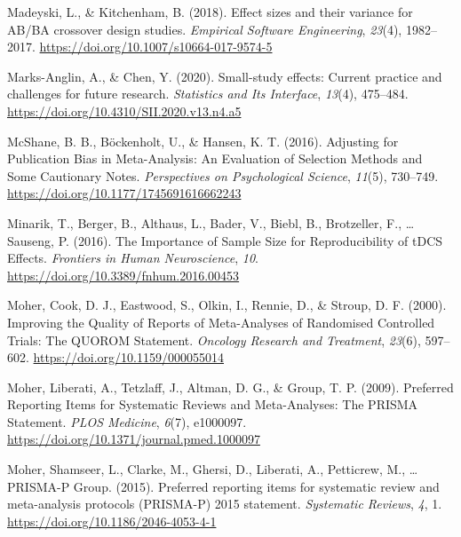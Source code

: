 \documentclass[
  man,floatsintext]{apa6}
\newlength{\cslhangindent}
\newlength{\cslentryspacingunit} %
\newenvironment{CSLReferences}[2] %
 {%
  \setlength{\parindent}{0pt}
  \ifodd #1
  \let\oldpar\par
  \def\par{\hangindent=\cslhangindent\oldpar}
  \fi
  \setlength{\parskip}{#2\cslentryspacingunit}
 }%
 {}
\begin{document}
\begin{CSLReferences}{1}{0}
\leavevmode{}%
Madeyski, L., \& Kitchenham, B. (2018). Effect sizes and their variance for {AB}/{BA} crossover design studies. \emph{Empirical Software Engineering}, \emph{23}(4), 1982--2017. \url{https://doi.org/10.1007/s10664-017-9574-5}

\leavevmode{}%
Marks-Anglin, A., \& Chen, Y. (2020). Small-study effects: Current practice and challenges for future research. \emph{Statistics and Its Interface}, \emph{13}(4), 475--484. \url{https://doi.org/10.4310/SII.2020.v13.n4.a5}

\leavevmode{}%
McShane, B. B., Böckenholt, U., \& Hansen, K. T. (2016). Adjusting for {Publication Bias} in {Meta-Analysis}: {An Evaluation} of {Selection Methods} and {Some Cautionary Notes}. \emph{Perspectives on Psychological Science}, \emph{11}(5), 730--749. \url{https://doi.org/10.1177/1745691616662243}

\leavevmode{}%
Minarik, T., Berger, B., Althaus, L., Bader, V., Biebl, B., Brotzeller, F., \ldots{} Sauseng, P. (2016). The {Importance} of {Sample Size} for {Reproducibility} of {tDCS Effects}. \emph{Frontiers in Human Neuroscience}, \emph{10}. \url{https://doi.org/10.3389/fnhum.2016.00453}

\leavevmode{}%
Moher, Cook, D. J., Eastwood, S., Olkin, I., Rennie, D., \& Stroup, D. F. (2000). Improving the {Quality} of {Reports} of {Meta-Analyses} of {Randomised Controlled Trials}: {The QUOROM Statement}. \emph{Oncology Research and Treatment}, \emph{23}(6), 597--602. \url{https://doi.org/10.1159/000055014}

\leavevmode{}%
Moher, Liberati, A., Tetzlaff, J., Altman, D. G., \& Group, T. P. (2009). Preferred {Reporting Items} for {Systematic Reviews} and {Meta-Analyses}: {The PRISMA Statement}. \emph{PLOS Medicine}, \emph{6}(7), e1000097. \url{https://doi.org/10.1371/journal.pmed.1000097}

\leavevmode{}%
Moher, Shamseer, L., Clarke, M., Ghersi, D., Liberati, A., Petticrew, M., \ldots{} PRISMA-P Group. (2015). Preferred reporting items for systematic review and meta-analysis protocols ({PRISMA-P}) 2015 statement. \emph{Systematic Reviews}, \emph{4}, 1. \url{https://doi.org/10.1186/2046-4053-4-1}


\end{CSLReferences}
\end{document}
